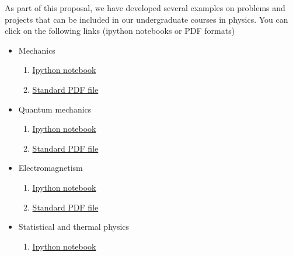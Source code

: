 \documentclass[%
oneside,                 %
final,                   %
10pt]{article}
\begin{document}
As part of this proposal, we have developed several examples on problems and projects that can be included in our undergraduate courses in physics. You can click on the following links (ipython notebooks or PDF formats)
\begin{itemize}
\item Mechanics
\begin{enumerate}

  \item \href{{https://github.com/CompPhysics/PAComputationsMSU/tree/master/doc/pub/Mechanics/ipynb}}{Ipython notebook}

  \item \href{{https://github.com/CompPhysics/PAComputationsMSU/tree/master/doc/pub/Mechanics/pdf/Mechanics-minted.pdf}}{Standard PDF file}

\end{enumerate}

\noindent
\item Quantum mechanics
\begin{enumerate}

  \item \href{{https://github.com/CompPhysics/PAComputationsMSU/tree/master/doc/pub/Quantum/ipynb}}{Ipython notebook}

  \item \href{{https://github.com/CompPhysics/PAComputationsMSU/tree/master/doc/pub/Quantum/pdf/Quantum-minted.pdf}}{Standard PDF file}

\end{enumerate}

\noindent
\item Electromagnetism
\begin{enumerate}

  \item \href{{https://github.com/CompPhysics/PAComputationsMSU/tree/master/doc/pub/Elmag/ipynb}}{Ipython notebook}

  \item \href{{https://github.com/CompPhysics/PAComputationsMSU/tree/master/doc/pub/Elmag/pdf/Elmag-minted.pdf}}{Standard PDF file}

\end{enumerate}

\noindent
\item Statistical and thermal physics
\begin{enumerate}

  \item \href{{https://github.com/CompPhysics/PAComputationsMSU/tree/master/doc/pub/StatPhys/ipynb}}{Ipython notebook}


\end{enumerate}
\end{itemize}
\end{document}
